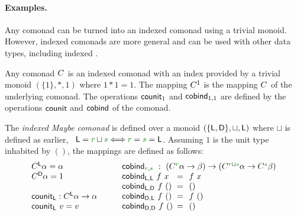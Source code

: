
\paragraph{Examples.}

Any comonad can be turned into an indexed comonad using a trivial monoid. However, indexed comonads
are more general and can be used with other data types, including indexed .

\begin{example}[Comonads]
Any comonad $C^{}$ is an indexed comonad with an index provided by a trivial monoid $(\{1\},\ast,1)$
where $1\ast 1 = 1$. The mapping $C^{1}$ is the mapping $C^{}$ of the underlying comonad. The
operations $\textnormal{\sffamily counit}_1$ and $\textnormal{\sffamily cobind}_{1,1}$ are defined by the operations $\textnormal{\sffamily counit}$
and $\textnormal{\sffamily cobind}$ of the comonad.
\end{example}

\begin{example}
The \emph{indexed Maybe comonad} is defined over a monoid $(\{ \textnormal{\sffamily L},\textnormal{\sffamily D} \}, \sqcup,\textnormal{\sffamily L})$
where $\sqcup$ is defined as earlier, \ie~$\ident{L} = \cclrd{r} \sqcup \cclrd{s} \Longleftrightarrow \cclrd{r}=\cclrd{s}=\ident{L}$.
Assuming $1$ is the unit type inhabited by $()$, the mappings are defined as follows:
%
\begin{equation*}
\begin{array}{l}
\ctyp{\ident{L}}{\alpha} = \alpha\\
\ctyp{\ident{D}}{\alpha} = 1\\
\\
\ident{counit}_{\ident{L}} : \ctyp{\ident{L}}{\alpha} \rightarrow \alpha \\
\ident{counit}_{\ident{L}}~v = v\\
\end{array}
\qquad
\begin{array}{lcl}
\multicolumn{3}{l}{
  \ident{cobind}_{\cclrd{r},\cclrd{s}} ~:~ (\ctyp{\cclrd{r}}{\alpha} \rightarrow \beta)
    \rightarrow (\ctyp{\cclrd{r}\sqcup\cclrd{s}}{\alpha} \rightarrow \ctyp{\cclrd{s}}{\beta}) }\\
\ident{cobind}_{\ident{L},\ident{L}}~f~x &\narrow{=}& f~x\\
\ident{cobind}_{\ident{L},\ident{D}}~f~() &\narrow{=}& ()\\
\ident{cobind}_{\ident{D},\ident{L}}~f~() &\narrow{=}& f~()\\
\ident{cobind}_{\ident{D},\ident{D}}~f~() &\narrow{=}& ()\\
\end{array}
\end{equation*}
\end{example}

